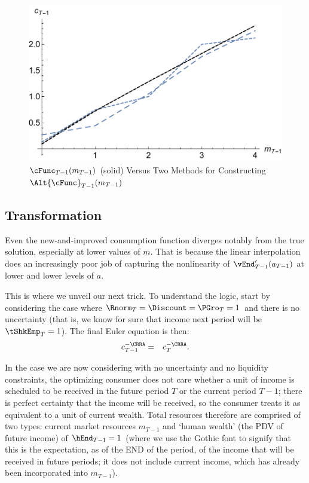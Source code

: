 \documentclass[titlepage]{\econtex}
\begin{document}
\hypertarget{PlotcTm1ABC}{}
\begin{figure}
        \includegraphics{./Figures/PlotcTm1ABC}
        \caption{$\cFunc_{T-1}({m}_{T-1})$ (solid) Versus Two Methods for Constructing $\Alt{\cFunc}_{T-1}({m}_{T-1})$}
        \label{fig:PlotcTm1ABC}
\end{figure}

\hypertarget{Transformation}{}
\subsection{Transformation}

Even the new-and-improved consumption function diverges notably from the true
solution, especially at lower values of ${m}$.  That is because the
linear interpolation does an increasingly poor job of capturing the
nonlinearity of $\vEnd_{T-1}^{\prime}({a}_{T-1})$ at
lower and lower levels of ${a}$.

This is where we unveil our next trick.  To understand the logic,
start by considering the case where $\Rnorm_{T} = \Discount =
\PGro_{T} = 1$ and there is no uncertainty
 (that is, we know for sure that income next period
will be $\tShkEmp_{T} = 1$).  The final Euler equation is then:
\begin{eqnarray}
        {c}_{T-1}^{-\CRRA} & = & {c}_{T}^{-\CRRA}.
\end{eqnarray}

In the case we are now considering with no uncertainty and no liquidity
constraints, the optimizing consumer does not care whether a unit of
income is scheduled to be received in the future period $T$ or the
current period $T-1$; there is perfect certainty that the income will
be received, so the consumer treats it as equivalent to a unit of
current wealth.  Total resources therefore are comprised of two types:
current market resources ${m}_{T-1}$ and `human wealth' (the PDV of
future income) of $\hEnd_{T-1}=1$ (where we use the Gothic font to
signify that this is the expectation, as of the END of the period, of
the income that will be received in future periods; it does not
include current income, which has already been incorporated into
${m}_{T-1}$).
\end{document}
